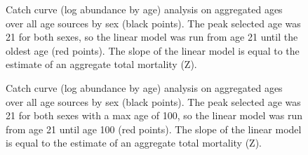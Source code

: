\documentclass[
]{scrartcl}
\begin{document}
\begin{figure}[H]


\caption{\label{fig-CC_Z}Catch curve (log abundance by age) analysis on
aggregated ages over all age sources by sex (black points). The peak
selected age was 21 for both sexes, so the linear model was run from age
21 until the oldest age (red points). The slope of the linear model is
equal to the estimate of an aggregate total mortality (Z).}

\end{figure}%

\begin{figure}[H]


\caption{\label{fig-CC_Z_100}Catch curve (log abundance by age) analysis
on aggregated ages over all age sources by sex (black points). The peak
selected age was 21 for both sexes with a max age of 100, so the linear
model was run from age 21 until age 100 (red points). The slope of the
linear model is equal to the estimate of an aggregate total mortality
(Z).}

\end{figure}%
\end{document}
